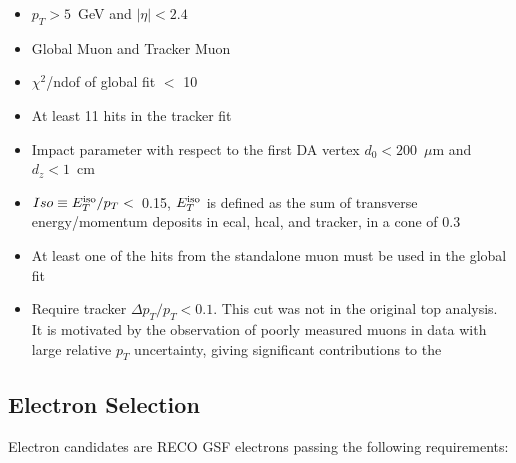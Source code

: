\begin{itemize}

\item $p_{T} > 5$~GeV and $|\eta| < 2.4$

\item Global Muon and Tracker Muon

\item $\chi^2$/ndof of global fit $<$ 10

\item At least 11 hits in the tracker fit

\item Impact parameter with respect to the first DA vertex $d_{0} < 200$~$\mu$m and $d_{z} < 1$~cm

\item $Iso \equiv E_T^{\rm iso}/p_T < $~0.15, $E_T^{\rm iso}$ is defined as the sum of 
transverse energy/momentum deposits in ecal, hcal, and tracker, in a cone of 0.3

\item At least one of the hits from the 
standalone muon must be used in the global fit

\item Require tracker $\Delta p_T/p_T < 0.1$. This cut was not in the original top analysis.
It is motivated by the observation of poorly measured muons in data with large
relative $p_T$ uncertainty, giving significant contributions to the \met

\end{itemize}



\subsection{Electron Selection}
\label{sec:electron}

Electron candidates are RECO GSF electrons passing the following requirements:

